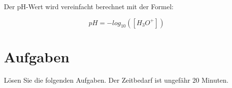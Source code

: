 Der pH-Wert wird vereinfacht berechnet mit der Formel:

\begin{equation}
    pH = -log_{10}([H_3O^+])
\end{equation}



\section*{Aufgaben}


Lösen Sie die folgenden Aufgaben. Der Zeitbedarf ist ungefähr 20 Minuten.

